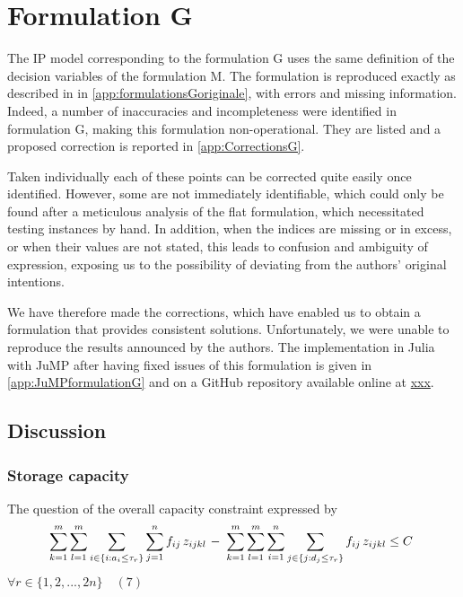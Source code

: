 \documentclass[preprint,12pt,authoryear]{elsarticle}
\begin{document}
%
%
\section{Formulation G}\label{sec:FormulationG}

The IP model corresponding to the formulation G uses the same definition of the decision variables  of  the formulation M.
%
The formulation is reproduced exactly as  described in \citep{Gelareh2015,GELAREH2016,Gelareh2021} in  \ref{app:formulationsGoriginale}, with errors and missing information.
%
%
Indeed, a number of inaccuracies and incompleteness were identified in formulation G, making this formulation non-operational.
%
They are listed and a proposed correction is reported in \ref{app:CorrectionsG}.

Taken individually each of these points can be corrected quite easily once identified. 
%
However, some are not immediately identifiable, 
which could only be found after a meticulous analysis of the flat formulation, which necessitated testing instances by hand.
%
In addition, when the indices are missing or in excess, or when their values are not stated, this leads to confusion and ambiguity of expression, exposing us to the possibility of deviating from the authors' original intentions.

We have therefore made the corrections, which have enabled us to obtain a formulation that provides consistent solutions. 
Unfortunately, we were unable to reproduce the results announced by the authors.
%
The implementation  in Julia with JuMP after having fixed issues of this formulation is given in \ref{app:JuMPformulationG} and on a GitHub repository available online at \url{xxx}.    

%
%
\subsection{Discussion}\label{sec:discussionG}
\smallskip

%
%
\subsubsection{Storage capacity}

The question of the overall capacity constraint expressed by 
%
 $$\sum\limits_{k=1}^{m} \sum_{l=1}^{m} \sum_{i\in\{i:a_{i} \le \tau_r\}} \sum_{j=1}^{n} f_{ij} \, z_{ijkl} \ \color{black}{-}\color{black} \ \sum_{k=1}^{m} \sum_{l=1}^{m} \color{black}\sum_{i=1}^{n}\color{black} \sum_{j\in\{j:d_{j} \le \tau_r\}} f_{ij} \, z_{ijkl} \le  C \hspace{1mm}$$
 \hfill $ \forall r \in \{1,2,...,2n\} \quad (7)$
 
\end{document}
